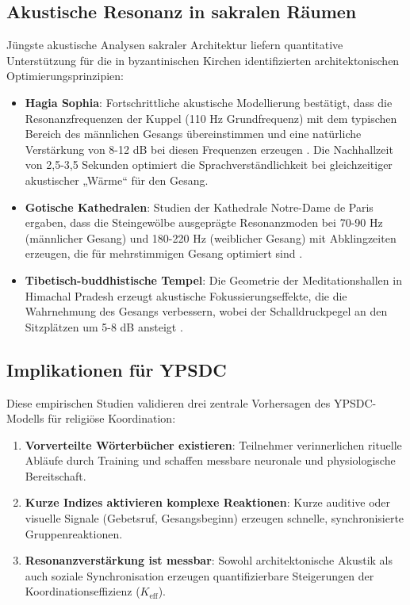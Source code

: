 \documentclass[12pt,a4paper]{article}
\begin{document}
	\subsection{Akustische Resonanz in sakralen Räumen}
	
	Jüngste akustische Analysen sakraler Architektur liefern quantitative Unterstützung für die in byzantinischen Kirchen identifizierten architektonischen Optimierungsprinzipien:
	
	\begin{itemize}
		\item \textbf{Hagia Sophia}: Fortschrittliche akustische Modellierung bestätigt, dass die Resonanzfrequenzen der Kuppel (110 Hz Grundfrequenz) mit dem typischen Bereich des männlichen Gesangs übereinstimmen und eine natürliche Verstärkung von 8-12 dB bei diesen Frequenzen erzeugen \cite{Pentcheva2020}. Die Nachhallzeit von 2,5-3,5 Sekunden optimiert die Sprachverständlichkeit bei gleichzeitiger akustischer „Wärme“ für den Gesang.
		
		\item \textbf{Gotische Kathedralen}: Studien der Kathedrale Notre-Dame de Paris ergaben, dass die Steingewölbe ausgeprägte Resonanzmoden bei 70-90 Hz (männlicher Gesang) und 180-220 Hz (weiblicher Gesang) mit Abklingzeiten erzeugen, die für mehrstimmigen Gesang optimiert sind \cite{Suarez2021}.
		
		\item \textbf{Tibetisch-buddhistische Tempel}: Die Geometrie der Meditationshallen in Himachal Pradesh erzeugt akustische Fokussierungseffekte, die die Wahrnehmung des Gesangs verbessern, wobei der Schalldruckpegel an den Sitzplätzen um 5-8 dB ansteigt \cite{Dimde2022}.
	\end{itemize}
	
	\subsection{Implikationen für YPSDC}
	
	Diese empirischen Studien validieren drei zentrale Vorhersagen des YPSDC-Modells für religiöse Koordination:
	
	\begin{enumerate}
		\item \textbf{Vorverteilte Wörterbücher existieren}: Teilnehmer verinnerlichen rituelle Abläufe durch Training und schaffen messbare neuronale und physiologische Bereitschaft.
		\item \textbf{Kurze Indizes aktivieren komplexe Reaktionen}: Kurze auditive oder visuelle Signale (Gebetsruf, Gesangsbeginn) erzeugen schnelle, synchronisierte Gruppenreaktionen.
		\item \textbf{Resonanzverstärkung ist messbar}: Sowohl architektonische Akustik als auch soziale Synchronisation erzeugen quantifizierbare Steigerungen der Koordinationseffizienz ($K_{\mathrm{eff}}$).
	\end{enumerate}
	
\end{document}
